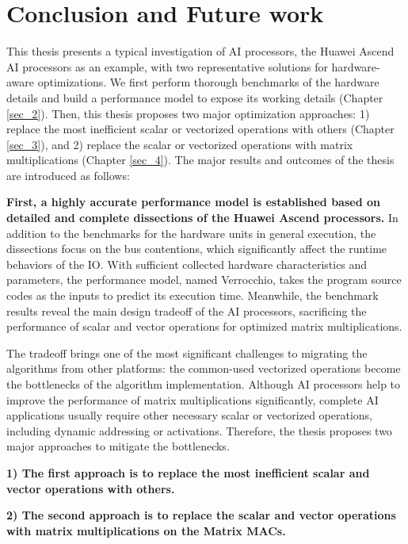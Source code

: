 \chapter{Conclusion and Future work}
\label{sec_5}

This thesis presents a typical investigation of AI processors, the Huawei Ascend AI processors as an example, with two representative solutions for hardware-aware optimizations. We first perform thorough benchmarks of the hardware details and build a performance model to expose its working details (Chapter \ref{sec_2}). Then, this thesis proposes two major optimization approaches: 1) replace the most inefficient scalar or vectorized operations with others (Chapter \ref{sec_3}), and 2) replace the scalar or vectorized operations with matrix multiplications (Chapter \ref{sec_4}). The major results and outcomes of the thesis are introduced as follows:

\textbf{First, a highly accurate performance model is established based on detailed and complete dissections of the Huawei Ascend processors.} 
In addition to the benchmarks for the hardware units in general execution, the dissections focus on the bus contentions, which significantly affect the runtime behaviors of the IO. With sufficient collected hardware characteristics and parameters, the performance model, named Verrocchio, takes the program source codes as the inputs to predict its execution time. Meanwhile, the benchmark results reveal the main design tradeoff of the AI processors, sacrificing the performance of scalar and vector operations for optimized matrix multiplications.

The tradeoff brings one of the most significant challenges to migrating the algorithms from other platforms: the common-used vectorized operations become the bottlenecks of the algorithm implementation. Although AI processors help to improve the performance of matrix multiplications significantly, complete AI applications usually require other necessary scalar or vectorized operations, including dynamic addressing or activations. Therefore, the thesis proposes two major approaches to mitigate the bottlenecks. 

\textbf{1) The first approach is to replace the most inefficient scalar and vector operations with others.} 

\textbf{2) The second approach is to replace the scalar and vector operations with matrix multiplications on the Matrix MACs.}